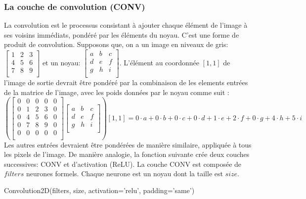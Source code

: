 \documentclass[12pt,a4paper]{article}
\begin{document}
\subsubsection{La couche de convolution (CONV)}
La convolution est le processus consistant à ajouter chaque élément de l'image à ses voisins immédiats,
pondéré par les éléments du noyau. C'est une forme de produit de convolution. Supposons que,
on a un image en niveaux de gris:
$\begin{bmatrix}
  1 & 2 & 3\\
  4 & 5 & 6\\
  7 & 8 & 9\\
\end{bmatrix}$
et un noyau:
$\begin{bmatrix}
  a & b & c\\
  d & e & f\\
  g & h & i\\
\end{bmatrix}$.
L'élément au coordonnée $[1, 1]$ de l'image de sortie devrait être pondéré par la combinaison de les elements entrées de la matrice de l'image, avec les poids données par le noyau comme suit :
$$\left(\begin{bmatrix}
  0 & 0 & 0 & 0 & 0\\
  0 & 1 & 2 & 3 & 0\\
  0 & 4 & 5 & 6 & 0\\
  0 & 7 & 8 & 9 & 0\\
  0 & 0 & 0 & 0 & 0\\
\end{bmatrix}
\begin{bmatrix}
  a & b & c\\
  d & e & f\\
  g & h & i\\
\end{bmatrix}\right)[1, 1] =
0\cdot a + 0\cdot b + 0\cdot c +
0\cdot d + 1\cdot e + 2\cdot f +
0\cdot g + 4\cdot h + 5\cdot i
$$
Les autres entrées devraient être pondérées de manière similaire, appliquée à tous les pixels de l'image.
De manière analogie, la fonction suivante crée deux couches successives: CONV et d'activation (ReLU).
La couche CONV est composée de $filters$ neurones formels. Chaque neurone est un noyau dont la taille
est $size$.
\begin{python}
Convolution2D(filters, size, activation='relu', padding='same')
\end{python}
\end{document}

